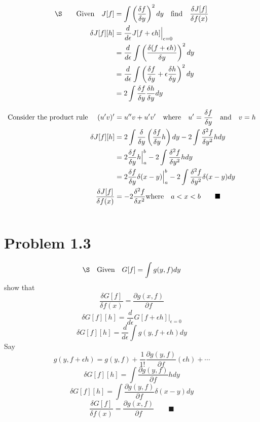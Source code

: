 \documentclass{memoir}
\begin{document}
\begin{align*}
    \qq*{\S}\qq{Given}J[f] & =\int \left(\frac{\delta f}{\delta y}\right)^2 dy\qq{find}\frac{\delta J[f]}{\delta f(x)}               \\
    \delta J[f][h]         & =\frac{d}{d\epsilon}J[f+\epsilon h]\Big\vert_{\epsilon=0}                                               \\
                           & =\frac{d}{d\epsilon}\int \left(\frac{\delta (f+\epsilon h)}{\delta y}\right)^2 dy                       \\
                           & =\frac{d}{d\epsilon}\int \left(\frac{\delta f}{\delta y}+\epsilon\frac{\delta h}{\delta y} \right)^2 dy \\
                           & =2\int \frac{\delta f}{\delta y}\frac{\delta h}{\delta y}  dy                                           \\
\end{align*}

\begin{align*}
    \qq*{Consider the product rule }(u'v)'            & =u''v+u'v' \qq{where} u'=\frac{\delta f}{\delta y}\qand v=h                    \\
    \delta J[f][h]                  & =2\int\frac{\delta}{\delta y}\left(\frac{\delta f}{\delta y}h\right)dy-2\int\frac{\delta^2 f}{\delta y^2}h dy \\
                                    & =2\frac{\delta f}{\delta y}h\Big\vert_a^b-2\int\frac{\delta^2 f}{\delta y^2}h dy                              \\
                                    & =2\frac{\delta f}{\delta y}\delta(x-y)\Big\vert_a^b-2\int\frac{\delta^2 f}{\delta y^2}\delta(x-y) dy          \\
    \frac{\delta J[f]}{\delta f(x)} & =-2\frac{\delta^2 f}{\delta x^2}\qq*{where}  a<x<b \qquad \blacksquare                                        \\
\end{align*}

\[\]

\section*{Problem 1.3}
 \[\S\qq{Given}G[f]=\int g(y,f)dy\]
show that \[\frac{\delta G[f]}{\delta f(x)}=\frac{\partial g(x,f)}{\partial f} \]
\[\delta G[f][h]=\frac{d}{d\epsilon}G[f+\epsilon h]\Big\vert_{\epsilon=0}\]
\[\delta G[f][h]=\frac{d}{d\epsilon}\int g(y,f+\epsilon h)dy\]
Say \[g(y,f+\epsilon h)=g(y,f)+\frac{1}{1!}\frac{\partial g(y,f)}{\partial f}(\epsilon h) + \cdots \]
\[\delta G[f][h]=\int\frac{\partial g(y,f)}{\partial f}hdy\]
\[\delta G[f][h]=\int\frac{\partial g(y,f)}{\partial f}\delta(x-y)dy\]
\[\frac{\delta G[f]}{\delta f(x)}=\frac{\partial g(x,f)}{\partial f} \qquad \blacksquare\]
\end{document}
